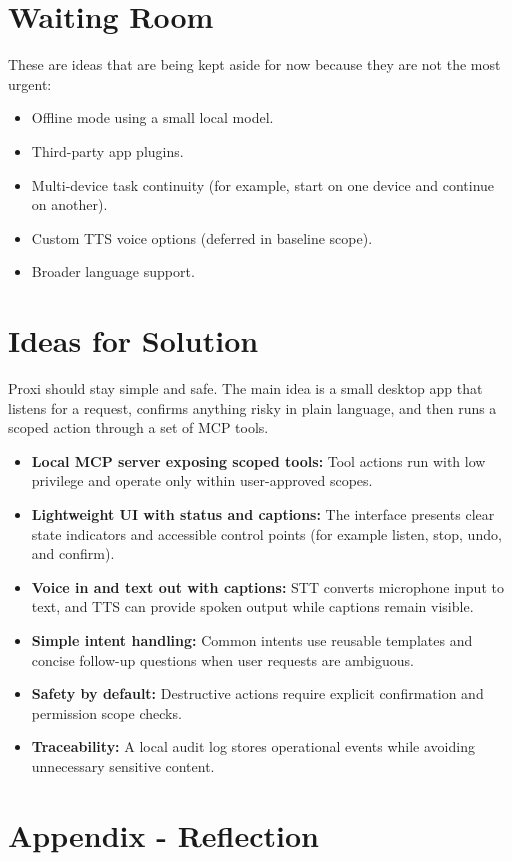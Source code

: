 \documentclass[12pt]{article}
\begin{document}
\section{Waiting Room}
These are ideas that are being kept aside for now because they are not
the most urgent:
\begin{itemize}
  \item Offline mode using a small local model.
  \item Third-party app plugins.
  \item Multi-device task continuity (for example, start on one device
  and continue on another).
  \item Custom TTS voice options (deferred in baseline scope).
  \item Broader language support.
\end{itemize}

\section{Ideas for Solution}
Proxi should stay simple and safe. The main idea is a small desktop
app that listens for a request, confirms anything risky in plain
language, and then runs a scoped action through a set of MCP tools.

\begin{itemize}
  \item \textbf{Local MCP server exposing scoped tools:} Tool actions
  run with low privilege and operate only within user-approved scopes.
  \item \textbf{Lightweight UI with status and captions:} The
  interface presents clear state indicators and accessible control
  points (for example listen, stop, undo, and confirm).
  \item \textbf{Voice in and text out with captions:} STT converts
  microphone input to text, and TTS can provide spoken output while
  captions remain visible.
  \item \textbf{Simple intent handling:} Common intents use reusable
  templates and concise follow-up questions when user requests are
  ambiguous.
  \item \textbf{Safety by default:} Destructive actions require
  explicit confirmation and permission scope checks.
  \item \textbf{Traceability:} A local audit log stores operational
  events while avoiding unnecessary sensitive content.
\end{itemize}

\newpage{}
\section*{Appendix - Reflection}




\newpage


\end{document}
